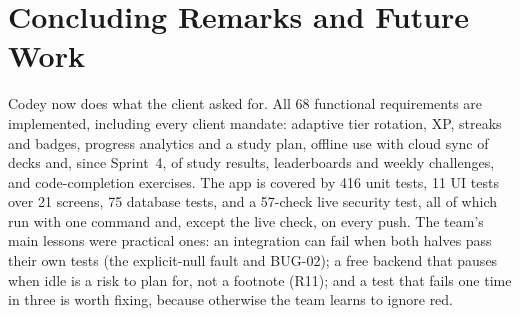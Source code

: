 \documentclass[12pt,letterpaper]{article}
\begin{document}
\section{Concluding Remarks and Future Work}\label{sec:conclusion}
Codey now does what the client asked for. All 68 functional requirements are
implemented, including every client mandate: adaptive tier rotation, XP, streaks and
badges, progress analytics and a study plan, offline use with cloud sync of decks and,
since Sprint~4, of study results, leaderboards and weekly challenges, and
code-completion exercises. The app is covered by 416 unit tests, 11 UI tests over 21
screens, 75 database tests, and a 57-check live security test, all of which run with
one command and, except the live check, on every push. The team's main lessons were
practical ones: an integration can fail when both halves pass their own tests (the
explicit-null fault and BUG-02); a free backend that pauses when idle is a risk to
plan for, not a footnote (R11); and a test that fails one time in three is worth
fixing, because otherwise the team learns to ignore red.
\end{document}
